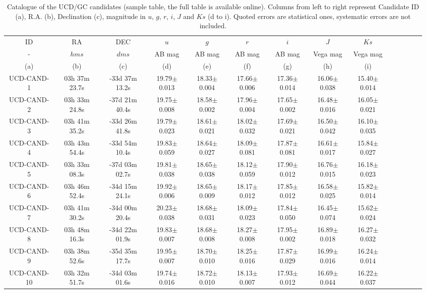 \documentclass[fleqn,usenatbib]{mnras}
\begin{document}


\begin{table*}
\caption {Catalogue of the UCD/GC candidates (sample table, the full table is available online). Columns from left to right represent Candidate ID (a), R.A. (b), Declination (c), magnitude in $u$, $g$, $r$, $i$, $J$ and $Ks$ (d to i). Quoted errors are statistical ones, systematic errors are not included.}
\begin{tabular}{ cccccccccccccc } \hline  
ID & RA & DEC & $u$ & $g$ & $r$ & $i$ & $J$ & $Ks$ \\
- & $hms$ & $dms$ & AB mag & AB mag & AB mag & AB mag & Vega mag & Vega mag \\
(a) & (b) &  (c) &  (d) &  (e) &  (f) &  (g)  &  (h) & (i) \\
\hline
UCD-CAND-1 & 03h 37m 23.7s & -33d 37m 13.2s & 19.79$\pm$0.013 & 18.33$\pm$0.004 & 17.66$\pm$0.006 & 17.36$\pm$0.014 & 16.06$\pm$0.038 & 15.40$\pm$0.014  \\ 
UCD-CAND-2 & 03h 33m 24.8s & -37d 21m 40.4s & 19.75$\pm$0.008 & 18.58$\pm$0.002 & 17.96$\pm$0.004 & 17.65$\pm$0.002 & 16.48$\pm$0.016 & 16.05$\pm$0.021  \\ 
UCD-CAND-3 & 03h 41m 35.2s & -33d 26m 41.8s & 19.79$\pm$0.023 & 18.61$\pm$0.021 & 18.02$\pm$0.032 & 17.69$\pm$0.021 & 16.50$\pm$0.042 & 16.10$\pm$0.035  \\ 
UCD-CAND-4 & 03h 43m 54.4s & -33d 54m 10.4s & 19.83$\pm$0.059 & 18.64$\pm$0.027 & 18.09$\pm$0.081 & 17.87$\pm$0.081 & 16.61$\pm$0.017 & 15.84$\pm$0.027  \\ 
UCD-CAND-5 & 03h 33m 08.3s & -37d 03m 02.7s & 19.81$\pm$0.038 & 18.65$\pm$0.038 & 18.12$\pm$0.059 & 17.90$\pm$0.012 & 16.76$\pm$0.015 & 16.18$\pm$0.023  \\ 
UCD-CAND-6 & 03h 46m 52.4s & -34d 15m 24.1s & 19.92$\pm$0.006 & 18.65$\pm$0.009 & 18.17$\pm$0.012 & 17.85$\pm$0.012 & 16.58$\pm$0.025 & 15.82$\pm$0.014  \\ 
UCD-CAND-7 & 03h 41m 30.2s & -34d 00m 20.4s & 20.23$\pm$0.038 & 18.68$\pm$0.031 & 18.09$\pm$0.023 & 17.84$\pm$0.050 & 16.45$\pm$0.074 & 15.62$\pm$0.024  \\ 
UCD-CAND-8 & 03h 48m 16.3s & -34d 22m 01.9s & 19.83$\pm$0.007 & 18.68$\pm$0.008 & 18.27$\pm$0.008 & 17.95$\pm$0.002 & 16.89$\pm$0.018 & 16.27$\pm$0.032  \\ 
UCD-CAND-9 & 03h 38m 52.6s & -35d 35m 17.7s & 19.95$\pm$0.007 & 18.70$\pm$0.010 & 18.25$\pm$0.016 & 17.87$\pm$0.029 & 16.99$\pm$0.016 & 16.24$\pm$0.014  \\ 
UCD-CAND-10 & 03h 32m 51.7s & -34d 03m 01.6s & 19.74$\pm$0.016 & 18.72$\pm$0.010 & 18.13$\pm$0.007 & 17.93$\pm$0.012 & 16.69$\pm$0.044 & 16.22$\pm$0.037  \\ 


\end{tabular}
\end{table*}
\end{document}
